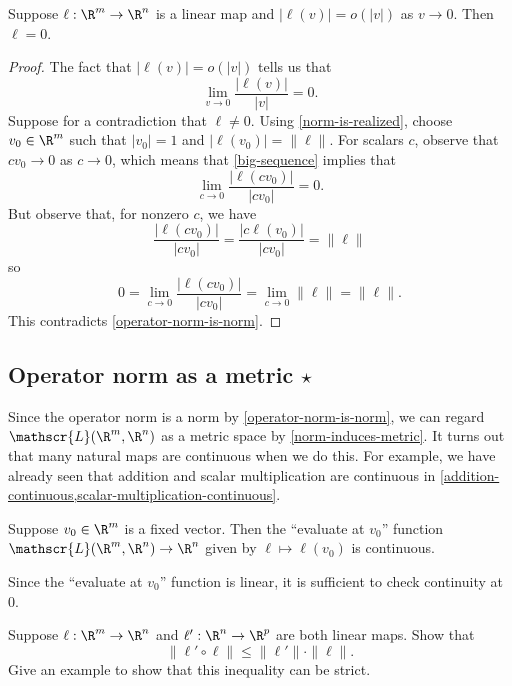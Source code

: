 \begin{lemma} \label{linear-and-small}
	Suppose $\ell : \R^m \to \R^n$ is a linear map and $|\ell(v)| = o(|v|)$ as $v \to 0$. Then $\ell = 0$. 
\end{lemma}

\begin{proof}
The fact that $|\ell(v)| = o(|v|)$ tells us that
\begin{equation} \label{big-sequence} \lim_{v \to 0} \frac{|\ell(v)|}{|v|} = 0. \end{equation}
Suppose for a contradiction that $\ell \neq 0$. Using \cref{norm-is-realized}, choose $v_0 \in \R^m$ such that $|v_0| = 1$ and $|\ell(v_0)| = \|\ell\|$. For scalars $c$, observe that $cv_0 \to 0$ as $c \to 0$, which means that \cref{big-sequence} implies that
\[ \lim_{c \to 0} \frac{|\ell(cv_0)|}{|cv_0|} = 0.  \]
But observe that, for nonzero $c$, we have
\[ \frac{|\ell(cv_0)|}{|cv_0|} = \frac{|c\ell(v_0)|}{|cv_0|} = \|\ell\| \]
so
\[ 0 = \lim_{c \to 0} \frac{|\ell(cv_0)|}{|cv_0|} = \lim_{c \to 0} \|\ell\| = \|\ell\|. \]
This contradicts \cref{operator-norm-is-norm}. 
\end{proof}

\subsection{Operator norm as a metric \texorpdfstring{$\star$}{*}}

Since the operator norm is a norm by \cref{operator-norm-is-norm}, we can regard $\mathscr{L}(\R^m, \R^n)$ as a metric space by \cref{norm-induces-metric}. It turns out that many natural maps are continuous when we do this. For example, we have already seen that addition and scalar multiplication are continuous in \cref{addition-continuous,scalar-multiplication-continuous}. 

\begin{exercise} \label{evaluation-continuous}
	Suppose $v_0 \in \R^m$ is a fixed vector. Then the ``evaluate at $v_0$'' function $\mathscr{L}(\R^m, \R^n) \to \R^n$ given by $\ell \mapsto \ell(v_0)$ is continuous. \begin{hint} Since the ``evaluate at $v_0$'' function is linear, it is sufficient to check continuity at 0. \end{hint}
\end{exercise}

\begin{exercise}[Submultiplicativity] \label{operator-norm-submultiplicative}
	Suppose $\ell : \R^m \to \R^n$ and $\ell' : \R^n \to \R^p$ are both linear maps. Show that \[ \|\ell' \circ \ell\| \leq \|\ell'\| \cdot \|\ell\|. \]
	Give an example to show that this inequality can be strict. 
\end{exercise}

